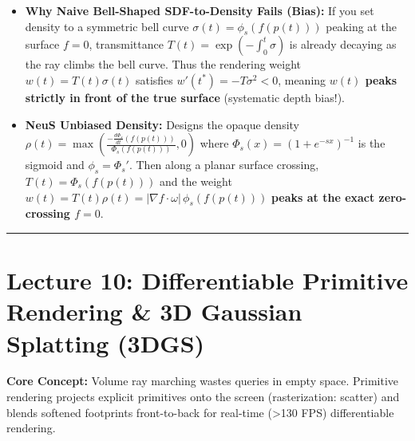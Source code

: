\documentclass[10pt, a4paper]{article}
\newcommand{\hr}{\vspace{0.8em}\hrule\vspace{0.8em}}
\begin{document}
\begin{itemize}
\begin{itemize}
        \item \textbf{Why Naive Bell-Shaped SDF-to-Density Fails (Bias):} If you set density to a symmetric bell curve $\sigma(t) = \phi_s(f(p(t)))$ peaking at the surface $f=0$, transmittance $T(t) = \exp(-\int_0^t \sigma)$ is already decaying as the ray climbs the bell curve. Thus the rendering weight $w(t) = T(t)\sigma(t)$ satisfies $w'(t^*) = -T\sigma^2 < 0$, meaning \textbf{$w(t)$ peaks strictly in front of the true surface} (systematic depth bias!).
        \item \textbf{NeuS Unbiased Density:} Designs the opaque density $\rho(t) = \max\!\left(\frac{-\frac{d\Phi_s}{dt}(f(p(t)))}{\Phi_s(f(p(t)))}, 0\right)$ where $\Phi_s(x) = (1+e^{-sx})^{-1}$ is the sigmoid and $\phi_s = \Phi_s'$. Then along a planar surface crossing, $T(t) = \Phi_s(f(p(t)))$ and the weight $w(t) = T(t)\rho(t) = |\nabla f\cdot\omega|\,\phi_s(f(p(t)))$ \textbf{peaks at the exact zero-crossing $f=0$}.
    \end{itemize}
\end{itemize}

\hr
\section*{\textcolor{primary}{Lecture 10: Differentiable Primitive Rendering \& 3D Gaussian Splatting (3DGS)}}
\textbf{Core Concept:} Volume ray marching wastes queries in empty space. Primitive rendering projects explicit primitives onto the screen (rasterization: scatter) and blends softened footprints front-to-back for real-time (>130 FPS) differentiable rendering.
\end{document}
